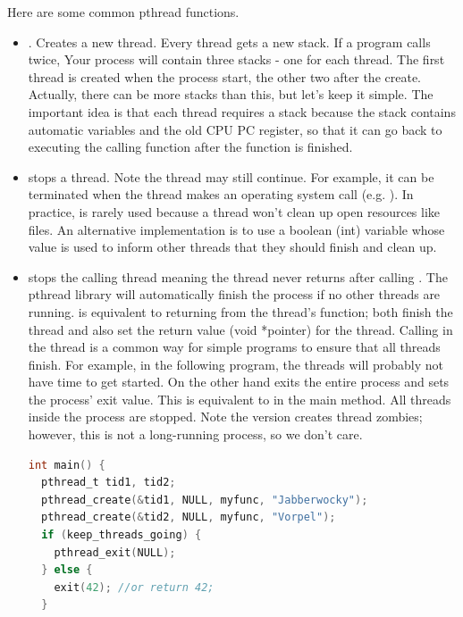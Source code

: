 Here are some common pthread functions.

\begin{itemize}
\item {}.
Creates a new thread.
Every thread gets a new stack.
If a program calls  twice, Your process will contain three stacks - one for each thread.
The first thread is created when the process start, the other two after the create.
Actually, there can be more stacks than this, but let's keep it simple.
The important idea is that each thread requires a stack because the stack contains automatic variables and the old CPU PC register, so that it can go back to executing the calling function after the function is finished.

\item {} stops a thread.
Note the thread may still continue.
For example, it can be terminated when the thread makes an operating system call (e.g. ).
In practice,  is rarely used because a thread won't clean up open resources like files.
An alternative implementation is to use a boolean (int) variable whose value is used to inform other threads that they should finish and clean up.

\item {} stops the calling thread meaning the thread never returns after calling .
The pthread library will automatically finish the process if no other threads are running.
 is equivalent to returning from the thread's function; both finish the thread and also set the return value (void *pointer) for the thread.
Calling  in the  thread is a common way for simple programs to ensure that all threads finish.
For example, in the following program, the  threads will probably not have time to get started.
On the other hand  exits the entire process and sets the process' exit value.
This is equivalent to  in the main method.
All threads inside the process are stopped.
Note the  version creates thread zombies; however, this is not a long-running process, so we don't care.

\begin{lstlisting}[language=C]
int main() {
  pthread_t tid1, tid2;
  pthread_create(&tid1, NULL, myfunc, "Jabberwocky");
  pthread_create(&tid2, NULL, myfunc, "Vorpel");
  if (keep_threads_going) {
    pthread_exit(NULL);
  } else {
    exit(42); //or return 42;
  }


\end{lstlisting}
\end{itemize}
